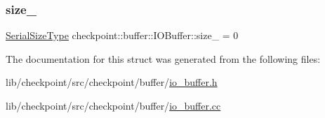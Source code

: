 \mbox{\label{structcheckpoint_1_1buffer_1_1_i_o_buffer_a33fee533bb344b3525bfffae726cb0d0}} 
\subsubsection{\texorpdfstring{size\+\_\+}{size\_}}
{\footnotesize\ttfamily \hyperlink{namespacecheckpoint_a083f6674da3f94c2901b18c6d238217c}{Serial\+Size\+Type} checkpoint\+::buffer\+::\+I\+O\+Buffer\+::size\+\_\+ = 0\hspace{0.3cm}{\ttfamily [private]}}



The documentation for this struct was generated from the following files\+:\begin{DoxyCompactItemize}
\item 
lib/checkpoint/src/checkpoint/buffer/\hyperlink{io__buffer_8h}{io\+\_\+buffer.\+h}\item 
lib/checkpoint/src/checkpoint/buffer/\hyperlink{io__buffer_8cc}{io\+\_\+buffer.\+cc}\end{DoxyCompactItemize}
